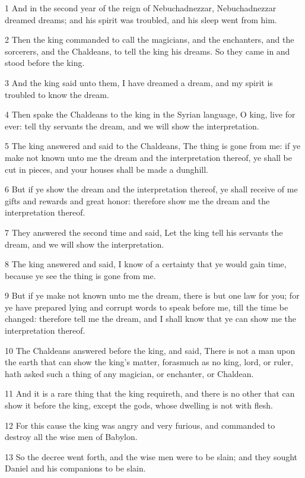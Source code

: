 \par 1 And in the second year of the reign of Nebuchadnezzar, Nebuchadnezzar dreamed dreams; and his spirit was troubled, and his sleep went from him.
\par 2 Then the king commanded to call the magicians, and the enchanters, and the sorcerers, and the Chaldeans, to tell the king his dreams. So they came in and stood before the king.
\par 3 And the king said unto them, I have dreamed a dream, and my spirit is troubled to know the dream.
\par 4 Then spake the Chaldeans to the king in the Syrian language, O king, live for ever: tell thy servants the dream, and we will show the interpretation.
\par 5 The king answered and said to the Chaldeans, The thing is gone from me: if ye make not known unto me the dream and the interpretation thereof, ye shall be cut in pieces, and your houses shall be made a dunghill.
\par 6 But if ye show the dream and the interpretation thereof, ye shall receive of me gifts and rewards and great honor: therefore show me the dream and the interpretation thereof.
\par 7 They answered the second time and said, Let the king tell his servants the dream, and we will show the interpretation.
\par 8 The king answered and said, I know of a certainty that ye would gain time, because ye see the thing is gone from me.
\par 9 But if ye make not known unto me the dream, there is but one law for you; for ye have prepared lying and corrupt words to speak before me, till the time be changed: therefore tell me the dream, and I shall know that ye can show me the interpretation thereof.
\par 10 The Chaldeans answered before the king, and said, There is not a man upon the earth that can show the king's matter, forasmuch as no king, lord, or ruler, hath asked such a thing of any magician, or enchanter, or Chaldean.
\par 11 And it is a rare thing that the king requireth, and there is no other that can show it before the king, except the gods, whose dwelling is not with flesh.
\par 12 For this cause the king was angry and very furious, and commanded to destroy all the wise men of Babylon.
\par 13 So the decree went forth, and the wise men were to be slain; and they sought Daniel and his companions to be slain.

